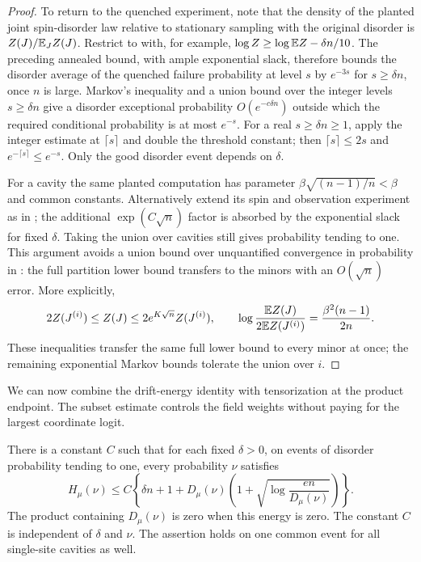 \begin{proof}
To return to the quenched experiment, note that the density of the
planted joint spin-disorder law relative to stationary sampling with the
original disorder is $Z(J)/\mathbb E_JZ(J)$.  Restrict to
 with, for example,
$\log Z\ge\log\mathbb E Z-\delta n/10$.  The preceding annealed bound, with
ample exponential slack, therefore bounds the disorder average of the
quenched failure probability at level $s$ by $e^{-3s}$ for
$s\ge\delta n$, once $n$ is large.  Markov's inequality and a union bound
over the integer levels $s\ge\delta n$ give a disorder exceptional
probability $O(e^{-c\delta n})$ outside which the required conditional
probability is at most $e^{-s}$.  For a real $s\ge\delta n\ge1$, apply
the integer estimate at $\lceil s\rceil$ and double the threshold
constant; then $\lceil s\rceil\le2s$ and
$e^{-\lceil s\rceil}\le e^{-s}$.
Only the good disorder event depends on $\delta$.

For a cavity the same planted computation has parameter
$\beta\sqrt{(n-1)/n}<\beta$ and common constants.  Alternatively extend
its spin and observation experiment as in
; the additional
$\exp(C\sqrt n)$ factor is absorbed by the exponential slack for fixed
$\delta$.  Taking the union over cavities still gives probability tending
to one.  This argument avoids a union bound over unquantified convergence
in probability in : the full partition lower
bound transfers to the minors with an $O(\sqrt n)$ error.  More explicitly,
\[
 2Z(J^{(i)})\le Z(J)\le2e^{K\sqrt n}Z(J^{(i)}),\qquad
 \log\frac{\mathbb E Z(J)}{2\mathbb E Z(J^{(i)})}
       =\frac{\beta^2(n-1)}{2n}.
\]
These inequalities transfer the same full lower bound to every minor at
once; the remaining exponential Markov bounds tolerate the union over $i$.
\end{proof}

We can now combine the drift-energy identity with tensorization at the
product endpoint.  The subset estimate controls the field weights without
paying for the largest coordinate logit.

\begin{theorem}\label{thm:stat-entropy}
There is a constant $C$ such that for each fixed $\delta>0$, on events of
disorder probability tending to one, every probability $\nu$ satisfies
\begin{equation}\label{eq:stat-entropy}
 H_\mu(\nu)\le C\left\{\delta n+1+
 D_\mu(\nu)\left(1+\sqrt{\log\frac{en}{D_\mu(\nu)}}\right)\right\}.
\end{equation}
The product containing $D_\mu(\nu)$ is zero when this energy is zero.
The constant $C$ is independent of $\delta$ and $\nu$.  The assertion
holds on one common event for all single-site cavities as well.
\end{theorem}

